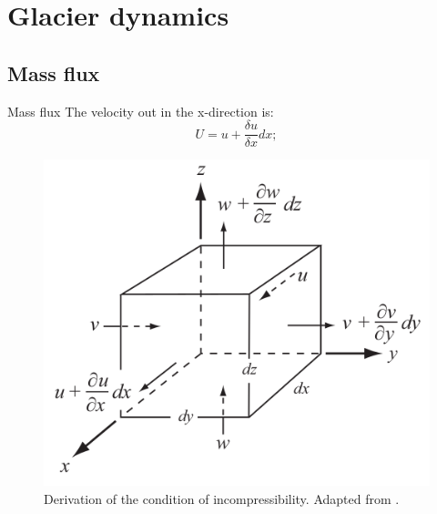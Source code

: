 \documentclass[11pt]{beamer}
\begin{document}
	\section{Glacier dynamics}
	\subsection{Mass flux}
		\begin{frame}{Mass flux}
		\justifying
		The velocity out in the x-direction is:
		\begin{equation}
			U = u+\frac{\delta u}{\delta x}dx;
		\end{equation}
		\begin{figure}
			\centering
			\includegraphics[scale=0.2]{../fig/Control_volume.png}
			\caption{Derivation of the condition of incompressibility. Adapted from \cite{hooke2019principles}.}
			\label{control_volume}
		\end{figure}
		\end{frame}
\end{document}
